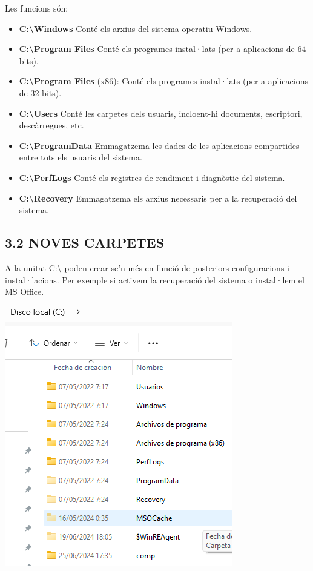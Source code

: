 \documentclass[
  a4paper,
]{article}
\providecommand{\tightlist}{%
  \setlength{\itemsep}{0pt}\setlength{\parskip}{0pt}}
\begin{document}
Les funcions són:

\begin{itemize}
\tightlist
\item
  \textbf{C:\textbackslash Windows} Conté els arxius del sistema
  operatiu Windows.
\item
  \textbf{C:\textbackslash Program Files} Conté els programes
  instal·lats (per a aplicacions de 64 bits).
\item
  \textbf{C:\textbackslash Program Files} (x86): Conté els programes
  instal·lats (per a aplicacions de 32 bits).
\item
  \textbf{C:\textbackslash Users} Conté les carpetes dels usuaris,
  incloent-hi documents, escriptori, descàrregues, etc.
\item
  \textbf{C:\textbackslash ProgramData} Emmagatzema les dades de les
  aplicacions compartides entre tots els usuaris del sistema.
\item
  \textbf{C:\textbackslash PerfLogs} Conté els registres de rendiment i
  diagnòstic del sistema.
\item
  \textbf{C:\textbackslash Recovery} Emmagatzema els arxius necessaris
  per a la recuperació del sistema.
\end{itemize}

\subsection{3.2 NOVES CARPETES}\label{noves-carpetes}

A la unitat C:\textbackslash{} poden crear-se'n més en funció de
posteriors configuracions i instal·lacions. Per exemple si activem la
recuperació del sistema o instal·lem el MS Office.

\includegraphics{png/carpetesPrincipalsCreadesDespres.png}
\end{document}
